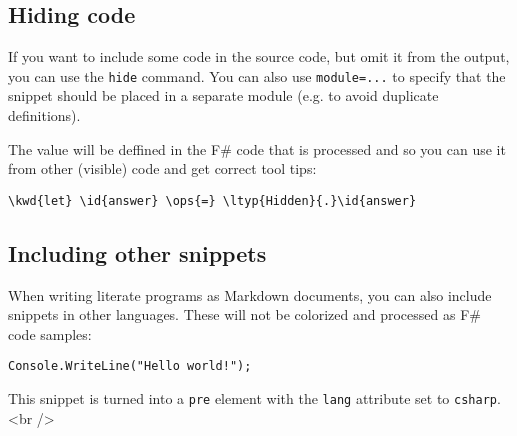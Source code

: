 \documentclass{article}
\newcommand{\id}[1]{\textcolor{black}{#1}}
\newcommand{\kwd}[1]{\textcolor{navy}{#1}}
\newcommand{\ops}[1]{\textcolor{purple}{#1}}
\begin{document}
\subsection*{Hiding code}



If you want to include some code in the source code,
but omit it from the output, you can use the \texttt{hide}
command. You can also use \texttt{module=...} to specify that
the snippet should be placed in a separate module
(e.g. to avoid duplicate definitions).


The value will be deffined in the F\# code that is
processed and so you can use it from other (visible)
code and get correct tool tips:
\begin{Verbatim}[commandchars=\\\{\}]
\kwd{let} \id{answer} \ops{=} \ltyp{Hidden}{.}\id{answer}

\end{Verbatim}

\subsection*{Including other snippets}



When writing literate programs as Markdown documents,
you can also include snippets in other languages.
These will not be colorized and processed as F\#
code samples:
\begin{lstlisting}
Console.WriteLine("Hello world!");

\end{lstlisting}


This snippet is turned into a \texttt{pre} element with the
\texttt{lang} attribute set to \texttt{csharp}.
<br />
\end{document}
